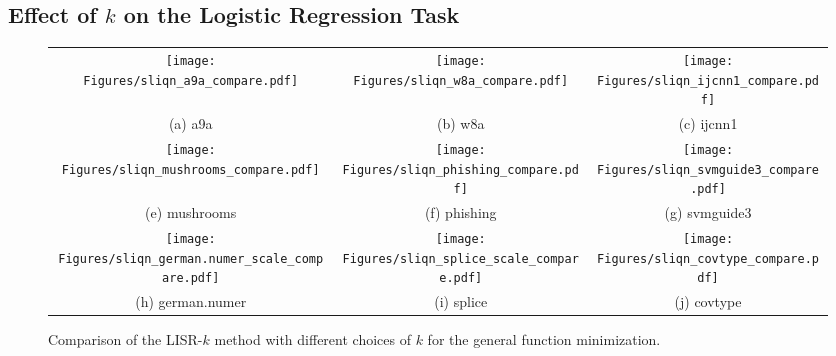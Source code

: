\documentclass[letterpaper]{article} %
\theoremstyle{plain}
\theoremstyle{definition}
\theoremstyle{remark}
\begin{document}
\subsection{Effect of $k$ on the Logistic Regression Task}
\begin{figure*}[!tb]
\centering
\begin{tabular}{ccc}
     \texttt{[image: Figures/sliqn\_a9a\_compare.pdf]}
     & \texttt{[image: Figures/sliqn\_w8a\_compare.pdf]}
     & \texttt{[image: Figures/sliqn\_ijcnn1\_compare.pdf]} \\
     (a) a9a & (b) w8a &  (c) ijcnn1 \\
     \texttt{[image: Figures/sliqn\_mushrooms\_compare.pdf]}
     & \texttt{[image: Figures/sliqn\_phishing\_compare.pdf]}
     & \texttt{[image: Figures/sliqn\_svmguide3\_compare.pdf]} \\   
     (e) mushrooms & (f) phishing &  (g) svmguide3 \\
     \texttt{[image: Figures/sliqn\_german.numer\_scale\_compare.pdf]}
     & \texttt{[image: Figures/sliqn\_splice\_scale\_compare.pdf]}
     & \texttt{[image: Figures/sliqn\_covtype\_compare.pdf]}    \\
     (h) german.numer & (i) splice &  (j) covtype \\
\end{tabular}
\caption{Comparison of the LISR-$k$ method with different choices of $k$ for the general function minimization. }
\label{fig:general_compare_res}
\end{figure*}
\end{document}
